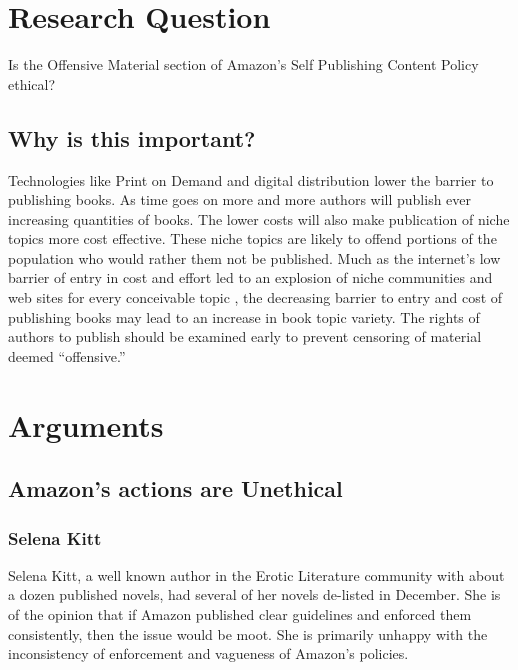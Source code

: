 \documentclass[11pt]{article}
\begin{document}
\begin{multicols}{2}
\section{Research Question}
Is the Offensive Material section of Amazon's Self Publishing Content Policy ethical?

\subsection{Why is this important?}

Technologies like Print on Demand and digital distribution lower the barrier to publishing books.  As time goes on more and more authors will publish ever increasing quantities of books.  The lower costs will also make publication of niche topics more cost effective.  These niche topics are likely to offend portions of the population who would rather them not be published.  Much as the internet's low barrier of entry in cost and effort led to an explosion of niche communities and web sites for every conceivable topic \cite{CitationNeeded}, the decreasing barrier to entry and cost of publishing books may lead to an increase in book topic variety.  The rights of authors to publish should be examined early to prevent censoring of material deemed ``offensive.''


\section{Arguments}

\subsection{Amazon's actions are Unethical}

\subsubsection{Selena Kitt}

Selena Kitt, a well known author in the Erotic Literature community with about a dozen published novels, had several of her novels de-listed in December.  She is of the opinion that if Amazon published clear guidelines and enforced them consistently, then the issue would be moot.  She is primarily unhappy with the inconsistency of enforcement and vagueness of Amazon's policies. \cite{KittSelfPubRevolution}


\end{multicols}
\end{document}
